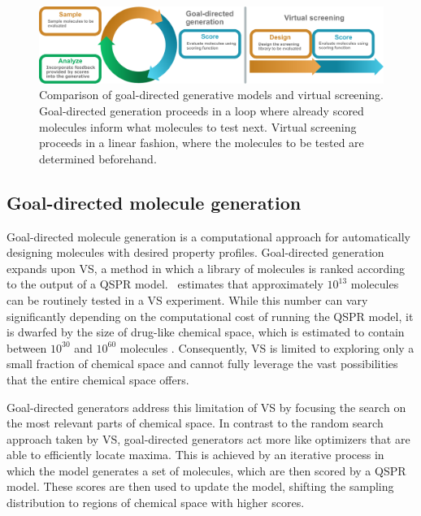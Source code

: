 \begin{figure}
      \centering
      \includegraphics[width=\textwidth]{./figures/goal_directed_cycle_and_virtual_screening.pdf}
      \caption{Comparison of goal-directed generative models and virtual screening. Goal-directed
            generation proceeds in a loop where already scored molecules inform what molecules to test next.
            Virtual screening proceeds in a linear fashion, where the molecules to be tested are determined
            beforehand. }
\end{figure}


\subsection{Goal-directed molecule generation}
Goal-directed molecule generation \citep{schneiderNovoMolecularDesign2013} is a computational
approach for automatically designing molecules with desired property profiles. Goal-directed
generation expands upon \ac{VS}, a method in which a library of molecules is ranked according to the
output of a \ac{QSPR} model.\ \citet{waltersVirtualChemicalLibraries2019} estimates that
approximately $10^{13}$ molecules can be routinely tested in a \ac{VS} experiment. While this number
can vary significantly depending on the computational cost of running the \ac{QSPR} model, it is
dwarfed by the size of drug-like chemical space, which is estimated to contain between $10^{30}$ and
$10^{60}$ molecules \citep{waltersVirtualChemicalLibraries2019,ruddigkeitEnumeration166Billion2012}.
Consequently, \ac{VS} is limited to exploring only a small fraction of chemical space and cannot
fully leverage the vast possibilities that the entire chemical space offers.

Goal-directed generators address this limitation of \ac{VS} by focusing the search on the most relevant
parts of chemical space. In contrast to the random search approach taken by \ac{VS}, goal-directed
generators act more like optimizers that are able to efficiently locate maxima. This is achieved by
an iterative process in which the model generates a set of molecules, which are then scored by a
\ac{QSPR} model. These scores are then used to update the model, shifting the sampling
distribution to regions of chemical space with higher scores.

